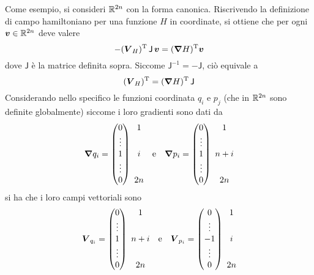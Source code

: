 Come esempio, si consideri $\mathbb{R}^{2n}$ con la forma canonica. Riscrivendo la definizione di campo hamiltoniano per una funzione $H$ in coordinate, si ottiene che per ogni $\boldsymbol{v} \in \mathbb{R}^{2n}$ deve valere
\begin{equation*}
-(\boldsymbol{V}_H)^{\mathrm{T}}\, \mathsf{J}\, \boldsymbol{v} = (\grad{H})^{\mathrm{T}} \boldsymbol{v}
\end{equation*}
dove $\mathsf{J}$ è la matrice definita sopra. Siccome $\mathsf{J}^{-1} = -\mathsf{J}$, ciò equivale a 
\begin{equation*}
(\boldsymbol{V}_H)^{\mathrm{T}} = (\grad{H})^{\mathrm{T}}\, \mathsf{J}
\end{equation*} 
Considerando nello specifico le funzioni coordinata $q_i$ e $p_j$ (che in $\mathbb{R}^{2n}$ sono definite globalmente) siccome i loro gradienti sono dati da
\begin{equation*}
\grad{q_i} = \pmqty{0 \\ \vdots \\ 1 \\ \vdots \\ 0}\ \mqty{1 \\ \phantom{\vdots} \\ i \\ \phantom{\vdots} \\ 2n} \qqtext{e} 
\grad{p_i} = \pmqty{0 \\ \vdots \\ 1 \\ \vdots \\ 0}\ \mqty{1 \\ \phantom{\vdots} \\ n+i \\ \phantom{\vdots} \\ 2n}
\end{equation*} 
si ha che i loro campi vettoriali sono 
\begin{equation*}
  \vec{V}_{q_i} = \pmqty{0 \\ \vdots \\ 1 \\ \vdots \\ 0}\ \mqty{1 \\ \phantom{\vdots} \\ n+i \\ \phantom{\vdots} \\ 2n} \qqtext{e} 
  \vec{V}_{p_i} = \pmqty{0 \\ \vdots \\ -1 \\ \vdots \\ 0}\ \mqty{1 \\ \phantom{\vdots} \\ i \\ \phantom{\vdots} \\ 2n}
\end{equation*} 
